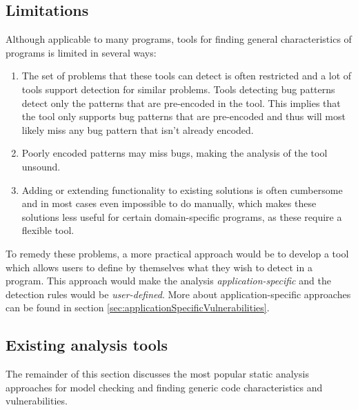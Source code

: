 \subsection{Limitations}
Although applicable to many programs, tools for finding general characteristics of programs is limited in several ways:
\begin{enumerate}
\item The set of problems that these tools can detect is often restricted and a lot of tools support detection for similar problems. Tools detecting bug patterns detect only the patterns that are pre-encoded in the tool. This implies that the tool only supports bug patterns that are pre-encoded and thus will most likely miss any bug pattern that isn't already encoded. 
\item Poorly encoded patterns may miss bugs, making the analysis of the tool unsound. 
\item Adding or extending functionality to existing solutions is often cumbersome and in most cases even impossible to do manually, which makes these solutions less useful for certain domain-specific programs, as these require a flexible tool. 
\end{enumerate}

To remedy these problems, a more practical approach would be to develop a tool which allows users to define by themselves what they wish to detect in a program. This approach would make the analysis \textit{application-specific} and the detection rules would be \textit{user-defined}. More about application-specific approaches can be found in section \ref{sec:applicationSpecificVulnerabilities}. 


\subsection{Existing analysis tools}

The remainder of this section discusses the most popular static analysis approaches for model checking and finding generic code characteristics and vulnerabilities.
